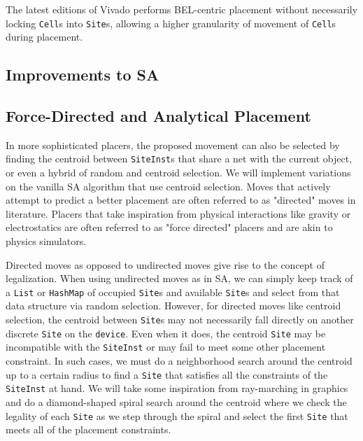 The latest editions of Vivado performs BEL-centric placement without necessarily locking \texttt{Cell}s into \texttt{Site}s, allowing a higher granularity of movement of \texttt{Cell}s during placement. 

\subsection{Improvements to SA}

\subsection{Force-Directed and Analytical Placement}

In more sophisticated placers, the proposed movement can also be selected by finding the centroid between \texttt{SiteInst}s that share a net with the current object, or even a hybrid of random and centroid selection. 
We will implement variations on the vanilla SA algorithm that use centroid selection. 
Moves that actively attempt to predict a better placement are often referred to as "directed" moves in literature. 
Placers that take inspiration from physical interactions like gravity or electrostatics are often referred to as "force directed" placers and are akin to physics simulators. 

Directed moves as opposed to undirected moves give rise to the concept of legalization. 
When using undirected moves as in SA, we can simply keep track of a \texttt{List} or \texttt{HashMap} of occupied \texttt{Site}s and available \texttt{Site}s and select from that data structure via random selection. 
However, for directed moves like centroid selection, the centroid between \texttt{Site}s may not necessarily fall directly on another discrete \texttt{Site} on the \texttt{device}. 
Even when it does, the centroid \texttt{Site} may be incompatible with the \texttt{SiteInst} or may fail to meet some other placement constraint. 
In such cases, we must do a neighborhood search around the centroid up to a certain radius to find a \texttt{Site} that satisfies all the constraints of the \texttt{SiteInst} at hand. 
We will take some inspiration from ray-marching in graphics and do a diamond-shaped spiral search around the centroid where we check the legality of each \texttt{Site} as we step through the spiral and select the first \texttt{Site} that meets all of the placement constraints. 

